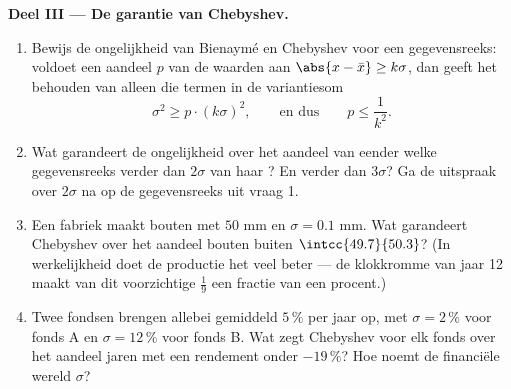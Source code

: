 \begin{problem}
\medskip
\noindent\textbf{Deel III --- De garantie van Chebyshev.}
\begin{enumerate}[resume]
  \item Bewijs de ongelijkheid van Bienaymé en Chebyshev voor een
        gegevensreeks: voldoet een aandeel $p$ van de waarden aan
        $\abs{x - \bar x} \geq k\sigma$, dan geeft het behouden van alleen
        die termen in de variantiesom
        \[
        \sigma^2 \geq p \cdot (k\sigma)^2,
        \qquad\text{en dus}\qquad
        p \leq \frac{1}{k^2} .
        \]
  \item Wat garandeert de ongelijkheid over het aandeel van eender welke
        gegevensreeks verder dan $2\sigma$ van haar ? En verder dan
        $3\sigma$? Ga de uitspraak over $2\sigma$ na op de gegevensreeks uit
        vraag 1.
  \item Een fabriek maakt bouten met  $50$ mm en $\sigma = 0.1$ mm.
        Wat garandeert Chebyshev over het aandeel bouten buiten
        $\intcc{49.7}{50.3}$? (In werkelijkheid doet de productie het veel
        beter --- de klokkromme van jaar 12 maakt van dit voorzichtige
        $\frac19$ een fractie van een procent.)
  \item Twee fondsen brengen allebei gemiddeld $5\,\%$ per jaar op, met
        $\sigma = 2\,\%$ voor fonds A en $\sigma = 12\,\%$ voor fonds B. Wat
        zegt Chebyshev voor elk fonds over het aandeel jaren met een
        rendement onder $-19\,\%$? Hoe noemt de financiële wereld $\sigma$?
\end{enumerate}


\end{problem}

